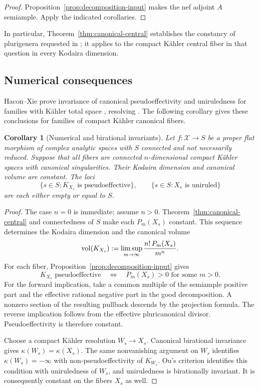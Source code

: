 \documentclass[11pt,a4paper]{article}
\numberwithin{equation}{section}
\newtheorem{corollary}[theorem]{Corollary}
\theoremstyle{definition}
\theoremstyle{remark}
\begin{document}
\begin{proof}
Proposition~\ref{prop:decomposition-input} makes the nef adjoint
$A$ semiample. Apply the indicated corollaries.
\end{proof}

In particular, Theorem~\ref{thm:canonical-central} establishes the
constancy of plurigenera requested in
\cite[Question~1.6]{CRW2026}; it applies to the compact Kähler
central fiber in that question in every Kodaira dimension.

\subsection{Numerical consequences}

Hacon--Xie prove invariance of canonical pseudoeffectivity and
uniruledness for families with Kähler total space
\cite[Corollary~7.8]{HX2026}, resolving
\cite[Conjecture~1.4]{HLR2026}. The following corollary gives these
conclusions for families of compact Kähler canonical fibers.

\begin{corollary}[Numerical and birational invariants]
\label{cor:numerical-invariants}
Let $f:\mathcal X\to S$ be a proper flat morphism of complex
analytic spaces with $S$ connected and not necessarily reduced.
Suppose that all fibers are
connected $n$-dimensional compact Kähler spaces with canonical
singularities. Their Kodaira dimension
and canonical volume are constant. The loci
\[
 \{s\in S:K_{X_s}\text{ is pseudoeffective}\},\qquad
 \{s\in S:X_s\text{ is uniruled}\}
\]
are each either empty or equal to $S$.
\end{corollary}

\begin{proof}
The case $n=0$ is immediate; assume $n>0$.
Theorem~\ref{thm:canonical-central} and connectedness of $S$ make
each $P_m(X_s)$ constant. This sequence determines the Kodaira
dimension and the canonical volume
\[
 \operatorname{vol}(K_{X_s})
 :=\limsup_{m\to\infty}\frac{n!\,P_m(X_s)}{m^n}.
\]
For each fiber, Proposition~\ref{prop:decomposition-input} gives
\[
 K_{X_s}\text{ pseudoeffective}
 \quad\Longleftrightarrow\quad
 P_m(X_s)>0\text{ for some }m>0.
\]
For the forward implication, take a common multiple of the
semiample positive part and the effective rational negative part
in the good decomposition. A nonzero section of the resulting
pullback descends by the projection formula. The reverse implication
follows from the effective pluricanonical divisor.
Pseudoeffectivity is therefore constant.

Choose a compact Kähler resolution $W_s\to X_s$.
Canonical birational invariance gives
$\kappa(W_s)=\kappa(X_s)$. The same nonvanishing argument on $W_s$
identifies $\kappa(W_s)=-\infty$ with non-pseudoeffectivity of
$K_{W_s}$. Ou's criterion \cite[Theorem~1.1]{Ou2025} identifies
this condition with uniruledness of $W_s$, and uniruledness is
birationally invariant. It is consequently constant on the fibers
$X_s$ as well.
\end{proof}
\end{document}
